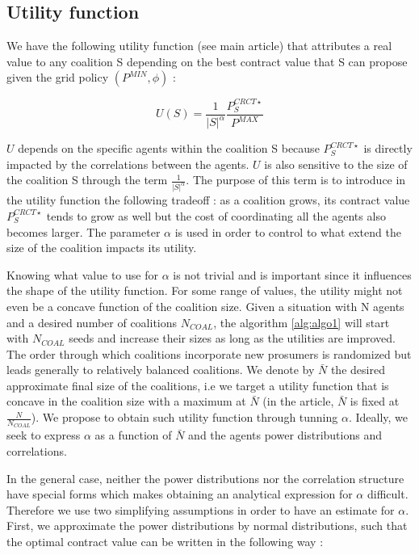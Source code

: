 \documentclass[journal]{IEEEtran}
\begin{document}
\subsection{Utility function}
\label{appendix_utility}

We have the following utility function (see main article) that attributes a real value to any coalition S depending on the best contract value that S can propose given the grid policy $ (P^{MIN},\phi)$ : 


\begin{equation}
	U(S) = \frac{1}{|S|^{\alpha}} \frac{ P_S^{CRCT \star} }{P^{MAX}}
\end{equation}


$ U $ depends on the specific agents within the coalition S because $ P_S^{CRCT \star} $ is directly impacted by the correlations between the agents. $ U $ is also sensitive to the size of the coalition S through the term $ \frac{1}{|S|^{ \alpha } } $. The purpose of this term is to introduce in the utility function the following tradeoff : as a coalition grows, its contract value $ P_S^{CRCT \star} $ tends to grow as well but the cost of coordinating all the agents also becomes larger. The parameter $ \alpha $ is used in order to control to what extend the size of the coalition impacts its utility.

Knowing what value to use for $ \alpha $ is not trivial and is important since it influences the shape of the utility function. For some range of values, the utility might not even be a concave function of the coalition size. Given a situation with N agents and a desired number of coalitions $ N_{COAL}$, the algorithm \ref{alg:algo1} will start with $ N_{COAL} $ seeds and increase their sizes as long as the utilities are improved. The order through which coalitions incorporate new prosumers is randomized but leads generally to relatively balanced coalitions. We denote by $ \bar{N} $ the desired approximate final size of the coalitions, i.e we target a utility function that is concave in the coalition size with a maximum at $ \bar{N} $ (in the article, $ \bar{N} $ is fixed at $\frac{N}{N_{COAL}}$). We propose to obtain such utility function through tunning $\alpha $. Ideally, we seek to express $ \alpha $ as a function of $ \bar{N} $ and the agents power distributions and correlations.

In the general case, neither the power distributions nor the correlation structure have special forms which makes obtaining an analytical expression for $ \alpha $ difficult. Therefore we use two simplifying assumptions in order to have an estimate for $ \alpha $. First, we approximate the power distributions by normal distributions, such that the optimal contract value can be written in the following way :
\end{document}
